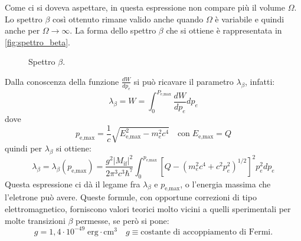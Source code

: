 Come ci si doveva aspettare, in questa espressione non compare più il volume $\Omega$. Lo spettro $\beta$ così ottenuto rimane valido anche quando $\Omega$ è variabile
e quindi anche per $\Omega\rightarrow\infty$. La forma dello spettro $\beta$ che si ottiene è rappresentata in \autoref{fig:spettro_beta}.
\begin{figure}[!h]
  \centering
  \caption{Spettro $\beta$.}
  \label{fig:spettro_beta}
  
\end{figure}
Dalla conoscenza della funzione $\frac{dW}{dp_e}$ si può ricavare il parametro $\lambda_{\beta}$, infatti:
\[
\lambda_{\beta}=W=\int_0^{P_{\text{e,max}}}\frac{dW}{dp_e}dp_e
\]
dove
\[
p_{\text{e,max}}=\frac{1}{c}\sqrt{E_{\text{e,max}}^2-m_e^2c^4}\quad\text{con}\;E_{\text{e,max}}=Q
\]
quindi per $\lambda_{\beta}$ si ottiene:
\[
\lambda_{\beta}=\lambda_{\beta}(p_{\text{e,max}})=\frac{g^2|M_{\text{if}}|^2}{2\pi^3c^3\hbar^7}\int_0^{p_{\text{e,max}}}[Q-(m_e^2c^4+c^2p_e^2)^{1/2}]^2p_e^2dp_e
\]
Questa espressione ci dà il legame fra $\lambda_{\beta}$ e $p_{\text{e,max}}$, o l'energia massima che l'eletrone può avere. Queste formule, con opportune correzioni di tipo
elettromagnetico, forniscono valori teorici molto vicini a quelli sperimentali per molte transizioni $\beta$ permesse, se però si pone:
\[
g=1,4\cdot10^{-49}\;\text{erg}\cdot\si{\centi\meter}^3\quad g\equiv\text{costante di accoppiamento di Fermi.}
\]
